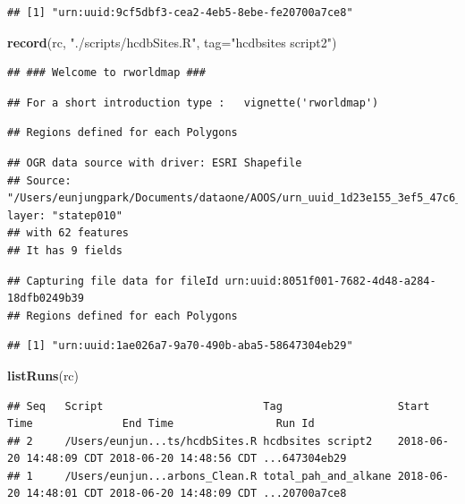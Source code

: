 \documentclass[]{article}
\newenvironment{Shaded}{\begin{snugshade}}{\end{snugshade}}
\newcommand{\DataTypeTok}[1]{\textcolor[rgb]{0.13,0.29,0.53}{#1}}
\newcommand{\KeywordTok}[1]{\textcolor[rgb]{0.13,0.29,0.53}{\textbf{#1}}}
\newcommand{\NormalTok}[1]{#1}
\newcommand{\StringTok}[1]{\textcolor[rgb]{0.31,0.60,0.02}{#1}}
\begin{document}
\begin{verbatim}
## [1] "urn:uuid:9cf5dbf3-cea2-4eb5-8ebe-fe20700a7ce8"
\end{verbatim}

\begin{Shaded}
\begin{Highlighting}[]
\KeywordTok{record}\NormalTok{(rc, }\StringTok{"./scripts/hcdbSites.R"}\NormalTok{, }\DataTypeTok{tag=}\StringTok{"hcdbsites script2"}\NormalTok{)}
\end{Highlighting}
\end{Shaded}

\begin{verbatim}
## ### Welcome to rworldmap ###
\end{verbatim}

\begin{verbatim}
## For a short introduction type :   vignette('rworldmap')
\end{verbatim}

\begin{verbatim}
## Regions defined for each Polygons
\end{verbatim}

\begin{verbatim}
## OGR data source with driver: ESRI Shapefile 
## Source: "/Users/eunjungpark/Documents/dataone/AOOS/urn_uuid_1d23e155_3ef5_47c6_9612_027c80855e8d/GIS", layer: "statep010"
## with 62 features
## It has 9 fields
\end{verbatim}

\begin{verbatim}
## Capturing file data for fileId urn:uuid:8051f001-7682-4d48-a284-18dfb0249b39
## Regions defined for each Polygons
\end{verbatim}

\begin{verbatim}
## [1] "urn:uuid:1ae026a7-9a70-490b-aba5-58647304eb29"
\end{verbatim}

\begin{Shaded}
\begin{Highlighting}[]
\KeywordTok{listRuns}\NormalTok{(rc)}
\end{Highlighting}
\end{Shaded}

\begin{verbatim}
## Seq   Script                         Tag                  Start Time              End Time                Run Id        
## 2     /Users/eunjun...ts/hcdbSites.R hcdbsites script2    2018-06-20 14:48:09 CDT 2018-06-20 14:48:56 CDT ...647304eb29 
## 1     /Users/eunjun...arbons_Clean.R total_pah_and_alkane 2018-06-20 14:48:01 CDT 2018-06-20 14:48:09 CDT ...20700a7ce8
\end{verbatim}
\end{document}
